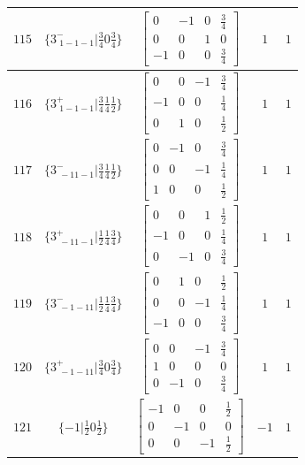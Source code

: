 \documentclass[fleqn,8pt]{jsarticle}
\begin{document}
\begin{longtable}{ccccc}
$ 115 $ & $ \{3^{-}_{\,\,1-1-1}|\frac{3}{4} 0 \frac{3}{4}\} $ & $ \begin{bmatrix} 0 & -1 & 0 & \frac{3}{4} \\ 0 & 0 & 1 & 0 \\ -1 & 0 & 0 & \frac{3}{4} \end{bmatrix} $ & $ 1 $ & $ 1 $ \\ \hline
$ 116 $ & $ \{3^{+}_{\,\,1-1-1}|\frac{3}{4} \frac{1}{4} \frac{1}{2}\} $ & $ \begin{bmatrix} 0 & 0 & -1 & \frac{3}{4} \\ -1 & 0 & 0 & \frac{1}{4} \\ 0 & 1 & 0 & \frac{1}{2} \end{bmatrix} $ & $ 1 $ & $ 1 $ \\ \hline
$ 117 $ & $ \{3^{-}_{\,\,-11-1}|\frac{3}{4} \frac{1}{4} \frac{1}{2}\} $ & $ \begin{bmatrix} 0 & -1 & 0 & \frac{3}{4} \\ 0 & 0 & -1 & \frac{1}{4} \\ 1 & 0 & 0 & \frac{1}{2} \end{bmatrix} $ & $ 1 $ & $ 1 $ \\ \hline
$ 118 $ & $ \{3^{+}_{\,\,-11-1}|\frac{1}{2} \frac{1}{4} \frac{3}{4}\} $ & $ \begin{bmatrix} 0 & 0 & 1 & \frac{1}{2} \\ -1 & 0 & 0 & \frac{1}{4} \\ 0 & -1 & 0 & \frac{3}{4} \end{bmatrix} $ & $ 1 $ & $ 1 $ \\ \hline
$ 119 $ & $ \{3^{-}_{\,\,-1-11}|\frac{1}{2} \frac{1}{4} \frac{3}{4}\} $ & $ \begin{bmatrix} 0 & 1 & 0 & \frac{1}{2} \\ 0 & 0 & -1 & \frac{1}{4} \\ -1 & 0 & 0 & \frac{3}{4} \end{bmatrix} $ & $ 1 $ & $ 1 $ \\ \hline
$ 120 $ & $ \{3^{+}_{\,\,-1-11}|\frac{3}{4} 0 \frac{3}{4}\} $ & $ \begin{bmatrix} 0 & 0 & -1 & \frac{3}{4} \\ 1 & 0 & 0 & 0 \\ 0 & -1 & 0 & \frac{3}{4} \end{bmatrix} $ & $ 1 $ & $ 1 $ \\ \hline
$ 121 $ & $ \{-1|\frac{1}{2} 0 \frac{1}{2}\} $ & $ \begin{bmatrix} -1 & 0 & 0 & \frac{1}{2} \\ 0 & -1 & 0 & 0 \\ 0 & 0 & -1 & \frac{1}{2} \end{bmatrix} $ & $ -1 $ & $ 1 $ \\ \hline

\end{longtable}
\end{document}
